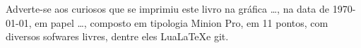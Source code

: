 \pagebreak

\ifodd\thepage\blankpage\fi

\parindent=0pt
\footnotesize\thispagestyle{empty}









\mbox{}\vfill
\begin{center}
		\begin{minipage}{.7\textwidth}\tiny\noindent{}
		\centering\tiny
		Adverte-se aos curiosos que se imprimiu este livro na gráfica \ldots{}, na data de \today, em papel \ldots{}, composto em tipologia Minion Pro, em 11 pontos, com diversos sofwares livres,
		dentre eles Lua\LaTeX e git.\\ 
		\medskip\\\
		\end{minipage}
\end{center}